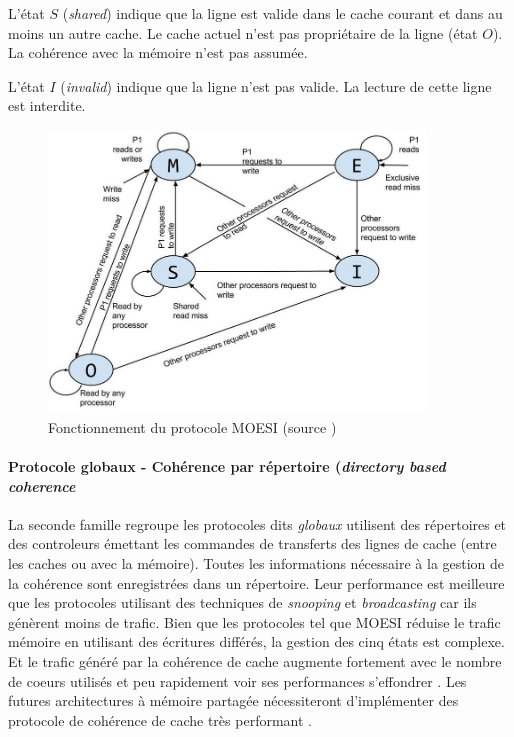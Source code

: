 L'état $S$ (\textit{shared}) indique que la ligne est valide dans le cache courant et dans au moins un autre cache. Le cache actuel n'est pas propriétaire de la ligne (état $O$). La cohérence avec la mémoire n'est pas assumée. 

L'état $I$ (\textit{invalid}) indique que la ligne n'est pas valide. La lecture de cette ligne est interdite.


\begin{figure}
    \center
    \includegraphics[width=10cm]{images/moesi.png}
    \caption{\label{pic:moesi} Fonctionnement du protocole MOESI (source \cite{Sayin2014})}
\end{figure}





\paragraph{Protocole globaux - Cohérence par répertoire (\textit{directory based coherence}}

La seconde famille regroupe les protocoles dits \textit{globaux} utilisent des répertoires et des controleurs émettant les commandes de transferts des lignes de cache (entre les caches ou avec la mémoire)\cite{tang1976cache}. Toutes les informations nécessaire à la gestion de la cohérence sont enregistrées dans un répertoire. Leur performance est meilleure que les protocoles utilisant des techniques de \textit{snooping} et \textit{broadcasting} car ils génèrent moins de trafic. Bien que les protocoles tel que MOESI réduise le trafic mémoire en utilisant des écritures différés, la gestion des cinq états est complexe. Et le trafic généré par la cohérence de cache augmente fortement avec le nombre de coeurs utilisés et peu rapidement voir ses performances s'effondrer \cite{liu2016protocoles}. Les futures architectures à mémoire partagée nécessiteront d'implémenter des protocole de cohérence de cache très performant  \cite{al2010snoopy}.


















